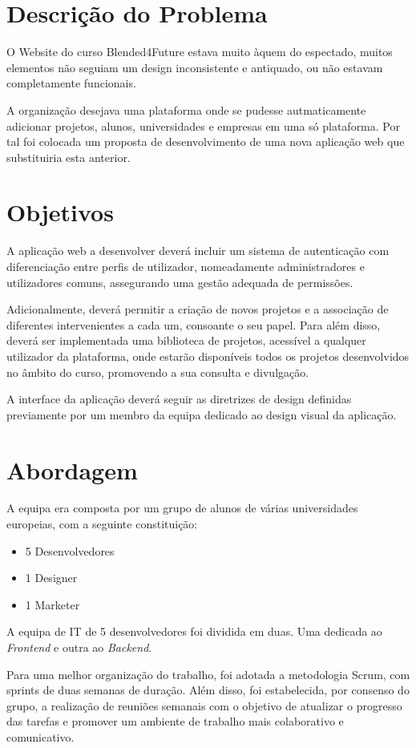 \section{Descrição do Problema}
\label{sec:introducao_descproblema}

O Website do curso Blended4Future estava muito àquem do espectado, muitos elementos não seguiam um design inconsistente e antiquado, ou não estavam completamente funcionais. 

A organização desejava uma plataforma onde se pudesse autmaticamente adicionar projetos, alunos, universidades e empresas em uma só plataforma. Por tal foi colocada um proposta de desenvolvimento de uma nova aplicação web que substituiria esta anterior. 



\section{Objetivos}

A aplicação web a desenvolver deverá incluir um sistema de autenticação com diferenciação entre perfis de utilizador, nomeadamente administradores e utilizadores comuns, assegurando uma gestão adequada de permissões. 

Adicionalmente, deverá permitir a criação de novos projetos e a associação de diferentes intervenientes a cada um, consoante o seu papel. Para além disso, deverá ser implementada uma biblioteca de projetos, acessível a qualquer utilizador da plataforma, onde estarão disponíveis todos os projetos desenvolvidos no âmbito do curso, promovendo a sua consulta e divulgação.

A interface da aplicação deverá seguir as diretrizes de design definidas previamente por um membro da equipa dedicado ao design visual da aplicação.



\section{Abordagem}

A equipa era composta por um grupo de alunos de várias universidades europeias, com a seguinte constituição:

\begin{itemize}
\item 5 Desenvolvedores
\item 1 Designer
\item 1 Marketer
\end{itemize}

A equipa de IT de 5 desenvolvedores foi dividida em duas. Uma dedicada ao \textit{Frontend} e outra ao \textit{Backend}.

Para uma melhor organização do trabalho, foi adotada a metodologia Scrum, com sprints de duas semanas de duração. Além disso, foi estabelecida, por consenso do grupo, a realização de reuniões semanais com o objetivo de atualizar o progresso das tarefas e promover um ambiente de trabalho mais colaborativo e comunicativo.